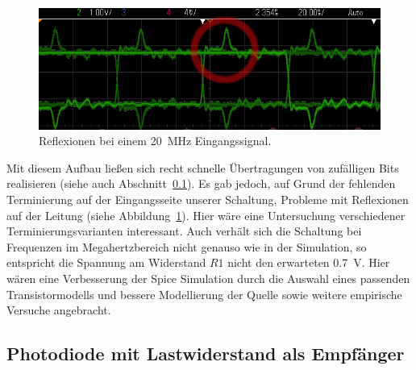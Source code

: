 \documentclass[12pt,a4paper]{article}
\begin{document}
\begin{figure}[!h]
  \centering
    \includegraphics[width=1.0\textwidth]{img/ring_20MHz.png}
  \caption{Reflexionen bei einem \SI{20}{\mega\hertz} Eingangssignal.}
  \label{fig:ring_20mhz}
\end{figure}

Mit diesem Aufbau ließen sich recht schnelle Übertragungen von zufälligen Bits realisieren (siehe auch Abschnitt~\ref{sec:direct_rx}). Es gab jedoch, auf Grund der fehlenden Terminierung auf der Eingangsseite unserer Schaltung, Probleme mit Reflexionen auf der Leitung (siehe Abbildung~\ref{fig:ring_20mhz}). Hier wäre eine Untersuchung verschiedener Terminierungsvarianten interessant. Auch verhält sich die Schaltung bei Frequenzen im Megahertzbereich nicht genauso wie in der Simulation, so entspricht die Spannung am Widerstand $R1$ nicht den erwarteten \SI{0.7}{\volt}. Hier wären eine Verbesserung der Spice Simulation durch die Auswahl eines passenden Transistormodells und bessere Modellierung der Quelle sowie weitere empirische Versuche angebracht.

\subsection{Photodiode mit Lastwiderstand als Empfänger}
\label{sec:direct_rx}
\end{document}
